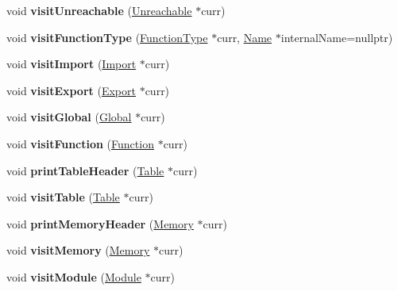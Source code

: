 \begin{DoxyCompactItemize}
void {\bfseries visit\+Unreachable} (\mbox{\hyperlink{classwasm_1_1_unreachable}{Unreachable}} $\ast$curr)
\item 
\mbox{\label{structwasm_1_1_print_s_expression_aeea1920829c0206d6c2f76b6d90b1056}} 
void {\bfseries visit\+Function\+Type} (\mbox{\hyperlink{classwasm_1_1_function_type}{Function\+Type}} $\ast$curr, \mbox{\hyperlink{structwasm_1_1_name}{Name}} $\ast$internal\+Name=nullptr)
\item 
\mbox{\label{structwasm_1_1_print_s_expression_af5886c28160e335229e66250148df4d6}} 
void {\bfseries visit\+Import} (\mbox{\hyperlink{classwasm_1_1_import}{Import}} $\ast$curr)
\item 
\mbox{\label{structwasm_1_1_print_s_expression_aebf8c86c335c1dca907abb85a62bb113}} 
void {\bfseries visit\+Export} (\mbox{\hyperlink{classwasm_1_1_export}{Export}} $\ast$curr)
\item 
\mbox{\label{structwasm_1_1_print_s_expression_ab1cb3c33a8846ea2580a2696b1b9b4e9}} 
void {\bfseries visit\+Global} (\mbox{\hyperlink{classwasm_1_1_global}{Global}} $\ast$curr)
\item 
\mbox{\label{structwasm_1_1_print_s_expression_a33d0ecb69bf249b7b95df65d75b20d80}} 
void {\bfseries visit\+Function} (\mbox{\hyperlink{classwasm_1_1_function}{Function}} $\ast$curr)
\item 
\mbox{\label{structwasm_1_1_print_s_expression_abaa79a39eda2e863ae253de0fa490522}} 
void {\bfseries print\+Table\+Header} (\mbox{\hyperlink{classwasm_1_1_table}{Table}} $\ast$curr)
\item 
\mbox{\label{structwasm_1_1_print_s_expression_a29a6bdc6d484b92ce358d4f0960384af}} 
void {\bfseries visit\+Table} (\mbox{\hyperlink{classwasm_1_1_table}{Table}} $\ast$curr)
\item 
\mbox{\label{structwasm_1_1_print_s_expression_a3861448f479d94e9dd49a0857b424e4d}} 
void {\bfseries print\+Memory\+Header} (\mbox{\hyperlink{classwasm_1_1_memory}{Memory}} $\ast$curr)
\item 
\mbox{\label{structwasm_1_1_print_s_expression_a39aa72ed4f4a9149a4383c67a4a31d4d}} 
void {\bfseries visit\+Memory} (\mbox{\hyperlink{classwasm_1_1_memory}{Memory}} $\ast$curr)
\item 
\mbox{\label{structwasm_1_1_print_s_expression_afac6e9cb5f1227af371036d1c0f07e2a}} 
void {\bfseries visit\+Module} (\mbox{\hyperlink{classwasm_1_1_module}{Module}} $\ast$curr)
\end{DoxyCompactItemize}
